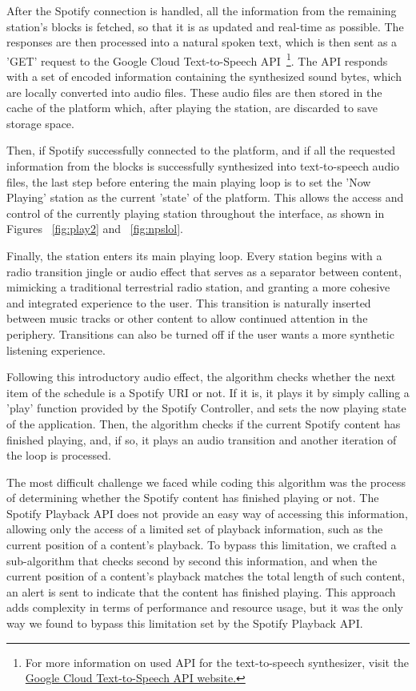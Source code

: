 After the Spotify connection is handled, all the information from the remaining station's blocks is fetched, so that it is as updated and real-time as possible. The responses are then processed into a natural spoken text, which is then sent as a 'GET' request to the Google Cloud Text-to-Speech API~\footnote{For more information on used API for the text-to-speech synthesizer, visit the \href{https://cloud.google.com/text-to-speech/docs}{Google Cloud Text-to-Speech API website.}}. The API responds with a set of encoded information containing the synthesized sound bytes, which are locally converted into audio files. These audio files are then stored in the cache of the platform which, after playing the station, are discarded to save storage space.

Then, if Spotify successfully connected to the platform, and if all the requested information from the blocks is successfully synthesized into text-to-speech audio files, the last step before entering the main playing loop is to set the 'Now Playing' station as the current 'state' of the platform. This allows the access and control of the currently playing station throughout the interface, as shown in Figures ~\ref{fig:play2} and ~\ref{fig:npslol}.

Finally, the station enters its main playing loop. Every station begins with a radio transition jingle or audio effect that serves as a separator between content, mimicking a traditional terrestrial radio station, and granting a more cohesive and integrated experience to the user. This transition is naturally inserted between music tracks or other content to allow continued attention in the periphery. Transitions can also be turned off if the user wants a more synthetic listening experience.

Following this introductory audio effect, the algorithm checks whether the next item of the schedule is a Spotify \ac{URI} or not. If it is, it plays it by simply calling a 'play' function provided by the Spotify Controller, and sets the now playing state of the application. Then, the algorithm checks if the current Spotify content has finished playing, and, if so, it plays an audio transition and another iteration of the loop is processed.

The most difficult challenge we faced while coding this algorithm was the process of determining whether the Spotify content has finished playing or not. The Spotify Playback \ac{API} does not provide an easy way of accessing this information, allowing only the access of a limited set of playback information, such as the current position of a content's playback. To bypass this limitation, we crafted a sub-algorithm that checks second by second this information, and when the current position of a content's playback matches the total length of such content, an alert is sent to indicate that the content has finished playing. This approach adds complexity in terms of performance and resource usage, but it was the only way we found to bypass this limitation set by the Spotify Playback \ac{API}.

